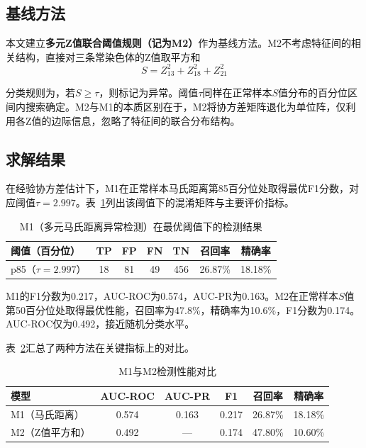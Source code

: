 \documentclass[withoutpreface]{cumcmthesis}
\begin{document}
\subsection{基线方法}

本文建立\textbf{多元Z值联合阈值规则（记为M2）}作为基线方法。M2不考虑特征间的相关结构，直接对三条常染色体的Z值取平方和
\begin{equation}\label{eq:zsquare}
  S = Z_{13}^2 + Z_{18}^2 + Z_{21}^2
\end{equation}

分类规则为，若$S \geq \tau$，则标记为异常。阈值$\tau$同样在正常样本$S$值分布的百分位区间内搜索确定。M2与M1的本质区别在于，M2将协方差矩阵退化为单位阵，仅利用各Z值的边际信息，忽略了特征间的联合分布结构。

\subsection{求解结果}

在经验协方差估计下，M1在正常样本马氏距离第85百分位处取得最优F1分数，对应阈值$\tau=2.997$。表~\ref{tab:q4-m1}列出该阈值下的混淆矩阵与主要评价指标。

\begin{table}[H]
  \centering
  \caption{M1（多元马氏距离异常检测）在最优阈值下的检测结果}\label{tab:q4-m1}
  \begin{tabular}{lcccccc}
    \toprule
    阈值（百分位） & TP & FP & FN & TN & 召回率 & 精确率 \\
    \midrule
    p85（$\tau=2.997$） & 18 & 81 & 49 & 456 & 26.87\% & 18.18\% \\
    \bottomrule
  \end{tabular}
\end{table}

M1的F1分数为0.217，AUC-ROC为0.574，AUC-PR为0.163。M2在正常样本$S$值第50百分位处取得最优性能，召回率为47.8\%，精确率为10.6\%，F1分数为0.174。AUC-ROC仅为0.492，接近随机分类水平。

表~\ref{tab:q4-compare}汇总了两种方法在关键指标上的对比。

\begin{table}[H]
  \centering
  \caption{M1与M2检测性能对比}\label{tab:q4-compare}
  \begin{tabular}{lccccc}
    \toprule
    模型 & AUC-ROC & AUC-PR & F1 & 召回率 & 精确率 \\
    \midrule
    M1（马氏距离） & 0.574 & 0.163 & 0.217 & 26.87\% & 18.18\% \\
    M2（Z值平方和） & 0.492 & --- & 0.174 & 47.80\% & 10.60\% \\
    \bottomrule
  \end{tabular}
\end{table}
\end{document}
